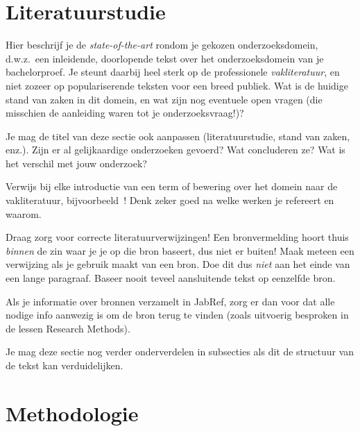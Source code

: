 
\section{Literatuurstudie}%
\label{sec:literatuurstudie}

Hier beschrijf je de \emph{state-of-the-art} rondom je gekozen onderzoeksdomein, d.w.z.\ een inleidende, doorlopende tekst over het onderzoeksdomein van je bachelorproef. Je steunt daarbij heel sterk op de professionele \emph{vakliteratuur}, en niet zozeer op populariserende teksten voor een breed publiek. Wat is de huidige stand van zaken in dit domein, en wat zijn nog eventuele open vragen (die misschien de aanleiding waren tot je onderzoeksvraag!)?

Je mag de titel van deze sectie ook aanpassen (literatuurstudie, stand van zaken, enz.). Zijn er al gelijkaardige onderzoeken gevoerd? Wat concluderen ze? Wat is het verschil met jouw onderzoek?

Verwijs bij elke introductie van een term of bewering over het domein naar de vakliteratuur, bijvoorbeeld~\autocite{Hykes2013}! Denk zeker goed na welke werken je refereert en waarom.

Draag zorg voor correcte literatuurverwijzingen! Een bronvermelding hoort thuis \emph{binnen} de zin waar je je op die bron baseert, dus niet er buiten! Maak meteen een verwijzing als je gebruik maakt van een bron. Doe dit dus \emph{niet} aan het einde van een lange paragraaf. Baseer nooit teveel aansluitende tekst op eenzelfde bron.

Als je informatie over bronnen verzamelt in JabRef, zorg er dan voor dat alle nodige info aanwezig is om de bron terug te vinden (zoals uitvoerig besproken in de lessen Research Methods).


Je mag deze sectie nog verder onderverdelen in subsecties als dit de structuur van de tekst kan verduidelijken.

\section{Methodologie}%
\label{sec:methodologie}

